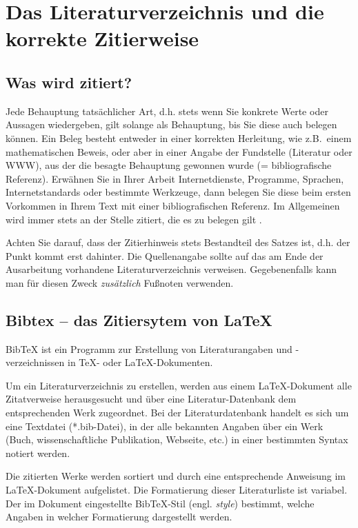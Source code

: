 %
\section{Das Literaturverzeichnis und die korrekte Zitierweise}
\label{sec_literatur}

\subsection{Was wird zitiert?}
Jede Behauptung tatsächlicher Art, d.h. stets wenn Sie konkrete Werte oder Aussagen wiedergeben, gilt solange als Behauptung, bis Sie diese auch belegen können.
Ein Beleg besteht entweder in einer korrekten Herleitung, wie z.B.~einem mathematischen Beweis, oder aber in einer Angabe der Fundstelle (Literatur oder WWW), aus der die besagte Behauptung gewonnen wurde (= bibliografische Referenz). 
Erwähnen Sie in Ihrer Arbeit Internetdienste, Programme, Sprachen, Internetstandards oder bestimmte Werkzeuge, dann belegen Sie diese beim ersten Vorkommen in Ihrem Text mit einer bibliografischen Referenz.
Im Allgemeinen wird immer stets an der Stelle zitiert, die es zu belegen gilt \cite{Marchionini}.

Achten Sie darauf, dass der Zitierhinweis stets Bestandteil des Satzes ist, d.h. der Punkt kommt erst dahinter.
Die Quellenangabe sollte auf das am Ende der Ausarbeitung vorhandene Literaturverzeichnis verweisen. 
Gegebenenfalls kann man für diesen Zweck {\em zusätzlich} Fußnoten verwenden.

\subsection{Bibtex -- das Zitiersytem von \LaTeX}

BibTeX ist ein Programm zur Erstellung von Literaturangaben und -verzeichnissen in TeX- oder \LaTeX-Dokumenten.

Um ein Literaturverzeichnis zu erstellen, werden aus einem \LaTeX-Dokument alle Zitatverweise herausgesucht und über eine Literatur-Datenbank dem entsprechenden Werk zugeordnet. Bei der Literaturdatenbank handelt es sich um eine Textdatei (*.bib-Datei), in der alle bekannten Angaben über ein Werk (Buch, wissenschaftliche Publikation, Webseite, etc.) in einer bestimmten Syntax notiert werden.

Die zitierten Werke werden sortiert und durch eine entsprechende Anweisung im LaTeX-Dokument aufgelistet. Die Formatierung dieser Literaturliste ist variabel. Der im Dokument eingestellte BibTeX-Stil (engl. {\em style}) bestimmt, welche Angaben in welcher Formatierung dargestellt werden.

